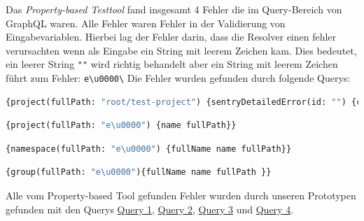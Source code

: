 Das \textit{Property-based Testtool} fand insgesamt 4 Fehler die im Query-Bereich von GraphQL waren.
Alle Fehler waren Fehler in der Validierung von Eingabevariablen.
Hierbei lag der Fehler darin, dass die Resolver einen fehler verursachten wenn als Eingabe ein String mit leerem Zeichen kam.
Dies bedeutet, ein leerer String \verb+""+ wird richtig behandelt aber ein String mit leerem Zeichen führt zum Fehler: \verb+e\u0000\+
Die Fehler wurden gefunden durch folgende Querys:

\begin{lstlisting}[language=GraphQL, caption=Fehler 1\cite{issue1}]
{project(fullPath: "root/test-project") {sentryDetailedError(id: "") {count}}}
\end{lstlisting}

\begin{lstlisting}[language=GraphQL, caption=Fehler 2\cite{issue2}]
{project(fullPath: "e\u0000") {name fullPath}}
\end{lstlisting}

\begin{lstlisting}[language=GraphQL, caption=Fehler 3\cite{issue3}]
{namespace(fullPath: "e\u0000") {fullName name fullPath}}
\end{lstlisting}

\begin{lstlisting}[language=GraphQL, caption=Fehler 4\cite{issue4}]
{group(fullPath: "e\u0000"){fullName name fullPath }}
\end{lstlisting}

Alle vom Property-based Tool gefunden Fehler wurden durch unseren Prototypen gefunden mit den Querys
\hyperref[query1]{Query 1},
\hyperref[query2]{Query 2},
\hyperref[query3]{Query 3} und
\hyperref[query4]{Query 4}.








